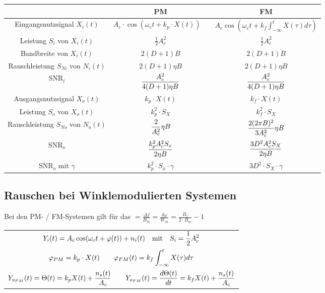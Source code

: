 \documentclass[a4paper]{article}
\begin{document}
\begin{twocolumn}
\begin{footnotesize}
\begin{tabular}{|c|c|c|}
  \hline & \textbf{PM} & \textbf{FM} \\ \hline
  Eingangsnutzsignal $X_i(t)$ & $A_c \cdot \cos(\omega_c t + k_p \cdot X(t)) \quad$ & $A_c \cos(\omega_c t + k_f \int_{-\infty}^t X(\tau) d\tau)$ \\\hline
  Leistung $S_i$ von $X_i(t)$ & $\frac{1}{2} A_c^2$ & $\frac{1}{2} A_c^2$ \\ \hline
  Bandbreite von $X_i(t)$ & $2(D + 1)B$ & $2(D + 1) B$ \\ \hline
  Rauschleistung $S_{Ni}$ von $N_i(t)$ & $2(D + 1)\eta B$ & $2(D + 1) \eta B$ \\ \hline
  $\text{SNR}_i$ & $\displaystyle \frac{A_c^2}{4(D+1)\eta B}$ &   $\displaystyle \frac{A_c^2}{4(D+1)\eta B}$ \\ \hline
  Ausgangsnutzsignal $X_o(t)$ & $k_p \cdot X(t)$ & $k_f \cdot X(t)$ \\ \hline
  Leistung $S_o$ von $X_o(t)$ & $k_p^2 \cdot S_X$ & $k_f^2 \cdot S_X$ \\ \hline
  Rauschleistung $S_{No}$ von $N_o(t)$ & $\displaystyle \frac{2}{A_c^2} \eta B$ & $\displaystyle \frac{2(2\pi B)^2}{3A_c^2} \eta B$ \\ \hline $\text{SNR}_o$ & $\displaystyle \frac{k_p^2 A_c^2 S_x}{2 \eta B}$ & $\displaystyle \frac{3 D^2 A_c^2 S_X}{2 \eta B}$ \\ \hline
  $\text{SNR}_o$ mit $\gamma$ & $k_p^2 \cdot S_x \cdot \gamma $ & $3 D^2 \cdot S_X \cdot \gamma$ \\ \hline
\end{tabular}
\end{footnotesize}


\subsection{Rauschen bei Winklemodulierten Systemen}

Bei den PM- / FM-Systemen gilt für das  $ = \frac{\Delta f}{B_m} = \frac{\delta
\omega}{W_m} = \frac{B_c}{2 \cdot B_m} - 1$

\begin{tabular}{c}
  $\displaystyle Y_i(t) = A_c \cos(\omega_c t + \varphi(t)) + n_i(t) \quad \text{mit} \quad S_i = \frac{1}{2} A_c^2$ \\
  $\displaystyle \varphi_{PM} = k_p \cdot X(t) \qquad \varphi_{FM}(t) = k_f \int_{-\infty}^t X(\tau) d\tau$\\
  $\displaystyle Y_{o_{PM}}(t) = \Theta(t) = k_p X(t) + \frac{n_s(t)}{A_c} \qquad Y_{o_{FM}}(t) = \frac{d\Theta(t)}{dt} = k_f X(t) + \frac{n_s(t)}{A_c}$
\end{tabular}



\end{twocolumn}
\end{document}

